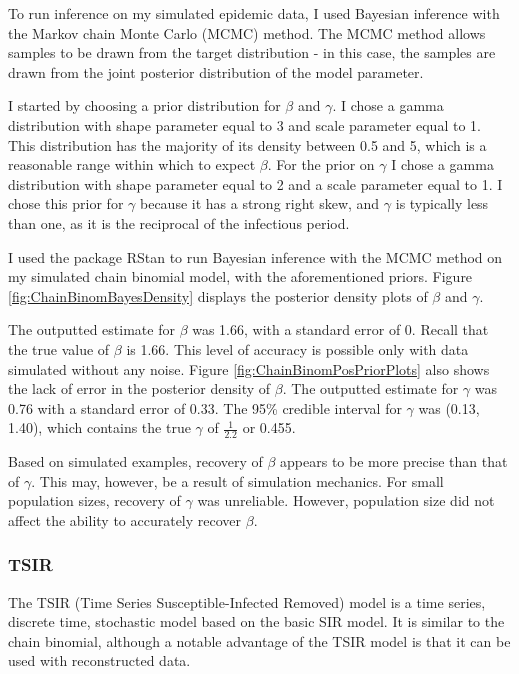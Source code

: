 \documentclass{article}
\begin{document}
To run inference on my simulated epidemic data, I used Bayesian inference with the Markov chain Monte Carlo (MCMC) method. The MCMC method allows samples to be drawn from the target distribution - in this case, the samples are drawn from the joint posterior distribution of the model parameter. 

I started by choosing a prior distribution for $\beta$ and $\gamma$. I chose a gamma distribution with shape parameter equal to 3 and scale parameter equal to 1. This distribution has the majority of its density between 0.5 and 5, which is a reasonable range within which to expect $\beta$. For the prior on $\gamma$ I chose a gamma distribution with shape parameter equal to 2 and a scale parameter equal to 1. I chose this prior for $\gamma$ because it has a strong right skew, and $\gamma$ is typically less than one, as it is the reciprocal of the infectious period. 

I used the package RStan to run Bayesian inference with the MCMC method on my simulated chain binomial model, with the aforementioned priors. Figure \ref{fig:ChainBinomBayesDensity} displays the posterior density plots of $\beta$ and $\gamma$. 


The outputted estimate for $\beta$ was 1.66, with a standard error of 0. Recall that the true value of $\beta$ is 1.66. This level of accuracy is possible only with data simulated without any noise. Figure \ref{fig:ChainBinomPosPriorPlots} also shows the lack of error in the posterior density of $\beta$. The outputted estimate for $\gamma$ was 0.76 with a standard error of 0.33. The 95\% credible interval for $\gamma$ was (0.13, 1.40), which contains the true $\gamma$ of $\frac{1}{2.2}$ or 0.455. 

Based on simulated examples, recovery of $\beta$ appears to be more precise than that of $\gamma$. This may, however, be a result of simulation mechanics. For small population sizes, recovery of $\gamma$ was unreliable. However, population size did not affect the ability to accurately recover $\beta$.  

\subsubsection{TSIR}
The TSIR (Time Series Susceptible-Infected Removed) model is a time series, discrete time, stochastic model based on the basic SIR model. It is similar to the chain binomial, although a notable advantage of the TSIR model is that it can be used with reconstructed data. 
\end{document}
